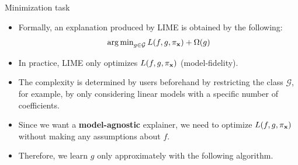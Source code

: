\documentclass[11pt,compress,t,notes=noshow, xcolor=table]{beamer}
\newcommand{\Gspace}{\mathcal{G}}
\newcommand{\neigh}{\pi_{\xv}}
\begin{document}
\begin{vbframe}{Minimization task}
	\begin{itemize}
		\item Formally, an explanation produced by LIME is obtained by the following: 
		$$ \argmin_{g \in \Gspace} L(f, g, \neigh) + \Omega(g)$$
		\item In practice, LIME only optimizes $L(f, g, \neigh)$ (model-fidelity). 	
		\item The complexity is determined by users beforehand by restricting the class $\Gspace$, for example, by only considering linear models with a specific number of coefficients. 
		\item Since we want a \textbf{model-agnostic} explainer, we need to optimize $L(f, g, \neigh)$ without making any assumptions about $f$. 
		\item Therefore, we learn $g$ only approximately with the following algorithm.  
		\end{itemize}
\end{vbframe} 
\end{document}
